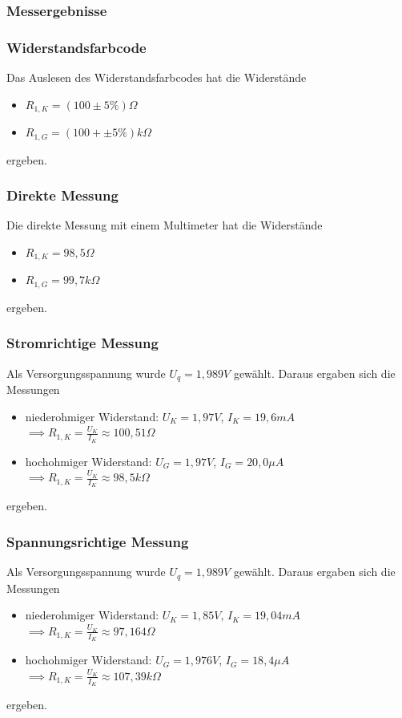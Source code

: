 \documentclass[a4paper]{article}
\begin{document}
\subsubsection{Messergebnisse}
\subsubsection*{Widerstandsfarbcode}
Das Auslesen des Widerstandsfarbcodes hat die Widerstände
\begin{itemize}
    \item $R_{1,K}=(100 \pm 5\% )\unit{\Omega}$
    \item $R_{1,G}=(100 + \pm 5 \%)\unit{k\Omega}$
\end{itemize}
ergeben.

\subsubsection*{Direkte Messung}
Die direkte Messung mit einem Multimeter hat die Widerstände
\begin{itemize}
    \item $R_{1,K}=98,5\unit{\Omega}$
    \item $R_{1,G}=99,7\unit{k\Omega}$
\end{itemize}
ergeben.

\subsubsection*{Stromrichtige Messung}
Als Versorgungsspannung wurde $U_{q}=1,989\unit{V}$ gewählt. Daraus ergaben sich die Messungen
\begin{itemize}
    \item niederohmiger Widerstand: $U_{K}=1,97\unit{V}$, $I_{K}=19,6\unit{mA}$
        $\implies R_{1,K}= \frac{U_{K}}{I_{K}}\approx 100,51\unit{\Omega}$
    \item hochohmiger Widerstand: $U_{G}=1,97\unit{V}$, $I_{G}=20,0\unit{\mu A}$
        $\implies R_{1,K}= \frac{U_{K}}{I_{K}}\approx 98,5\unit{k\Omega}$
\end{itemize}
ergeben.\newline


\subsubsection*{Spannungsrichtige Messung}
Als Versorgungsspannung wurde $U_{q}=1,989\unit{V}$ gewählt. Daraus ergaben sich die Messungen
\begin{itemize}
    \item niederohmiger Widerstand: $U_{K}=1,85\unit{V}$, $I_{K}=19,04\unit{mA}$
        $\implies R_{1,K}= \frac{U_{K}}{I_{K}}\approx 97,164\unit{\Omega}$
    \item hochohmiger Widerstand: $U_{G}=1,976\unit{V}$, $I_{G}=18,4\unit{\mu A}$
        $\implies R_{1,K}= \frac{U_{K}}{I_{K}}\approx 107,39\unit{k\Omega}$
\end{itemize}
ergeben.
\end{document}

